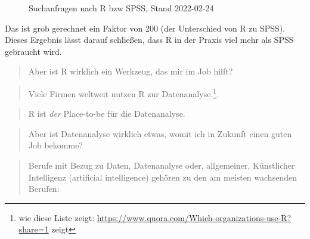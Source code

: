 \documentclass[
  letterpaper,
]{scrbook}
\theoremstyle{definition}
\theoremstyle{definition}
\theoremstyle{definition}
\theoremstyle{remark}
\begin{document}
\begin{figure}


\caption{\label{fig-stackoverflow1}Suchanfragen nach R bzw SPSS, Stand
2022-02-24}

\end{figure}%

Das ist grob gerechnet ein Faktor von 200 (der Unterschied von R zu
SPSS). Dieses Ergebnis lässt darauf schließen, dass R in der Praxis viel
mehr als SPSS gebraucht wird.

\begin{quote}
{} Aber ist R wirklich ein Werkzeug, das mir im Job
hilft?
\end{quote}

\begin{quote}
{} Viele Firmen weltweit nutzen R zur
Datenanalyse.\footnote{wie diese Liste zeigt:
  \url{https://www.quora.com/Which-organizations-use-R?share=1} zeigt}.
\end{quote}

\begin{quote}
{} R ist \emph{der} Place-to-be für die
Datenanalyse.
\end{quote}

\begin{quote}
{} Aber ist Datenanalyse wirklich etwas, womit ich in
Zukunft einen guten Job bekomme?
\end{quote}

\begin{quote}
{} Berufe mit Bezug zu Daten, Datenanalyse oder,
allgemeiner, Künstlicher Intelligenz (artificial intelligence) gehören
zu den am meisten wachsenden Berufen:
\end{quote}
\end{document}
